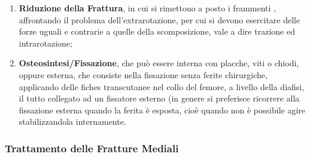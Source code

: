 \begin{enumerate}
\def\labelenumi{\arabic{enumi}.}
\item
  \textbf{Riduzione della Frattura}, in cui si rimettono a posto i
  frammenti , affrontando il problema dell'extrarotazione, per cui si
  devono esercitare delle forze uguali e contrarie a quelle della
  scomposizione, vale a dire trazione ed intrarotazione;
\item
  \textbf{Osteosintesi/Fissazione}, che può essere interna con placche,
  viti o chiodi, oppure esterna, che consiste nella fissazione senza
  ferite chirurgiche, applicando delle fiches transcutanee nel collo del
  femore, a livello della diafisi, il tutto collegato ad un fissatore
  esterno (in genere si preferisce ricorrere alla fissazione esterna
  quando la ferita è esposta, cioè quando non è possibile agire
  stabilizzandola internamente.
\end{enumerate}

\subsubsection{Trattamento delle Fratture Mediali}


